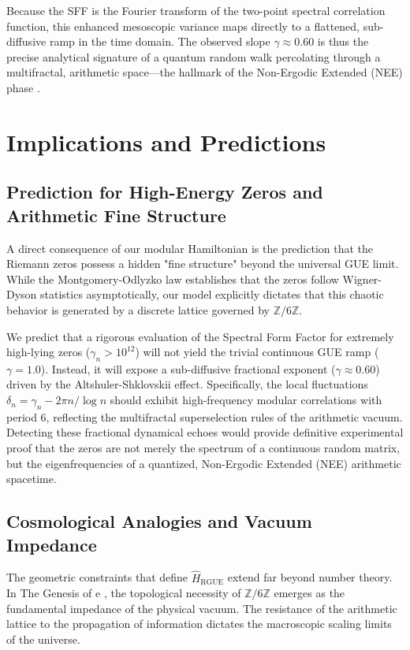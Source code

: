 \documentclass[aps,prl,preprint,superscriptaddress,floatfix]{revtex4-2}
\newcommand{\Zmod}{\mathbb{Z}/6\mathbb{Z}}
\begin{document}
Because the SFF is the Fourier transform of the two-point spectral correlation function, this enhanced mesoscopic variance maps directly to a flattened, sub-diffusive ramp in the time domain. The observed slope $\gamma \approx 0.60$ is thus the precise analytical signature of a quantum random walk percolating through a multifractal, arithmetic space—the hallmark of the Non-Ergodic Extended (NEE) phase \cite{Kravtsov2015, Khaymovich2020}.

\section{Implications and Predictions}

\subsection{Prediction for High-Energy Zeros and Arithmetic Fine Structure}

A direct consequence of our modular Hamiltonian is the prediction that the Riemann zeros possess a hidden "fine structure" beyond the universal GUE limit. While the Montgomery-Odlyzko law establishes that the zeros follow Wigner-Dyson statistics asymptotically, our model explicitly dictates that this chaotic behavior is generated by a discrete lattice governed by $\Zmod$.

We predict that a rigorous evaluation of the Spectral Form Factor for extremely high-lying zeros ($\gamma_n > 10^{12}$) will not yield the trivial continuous GUE ramp ($\gamma = 1.0$). Instead, it will expose a sub-diffusive fractional exponent ($\gamma \approx 0.60$) driven by the Altshuler-Shklovskii effect. Specifically, the local fluctuations $\delta_n = \gamma_n - 2\pi n/\log n$ should exhibit high-frequency modular correlations with period 6, reflecting the multifractal superselection rules of the arithmetic vacuum. Detecting these fractional dynamical echoes would provide definitive experimental proof that the zeros are not merely the spectrum of a continuous random matrix, but the eigenfrequencies of a quantized, Non-Ergodic Extended (NEE) arithmetic spacetime.

\subsection{Cosmological Analogies and Vacuum Impedance}

The geometric constraints that define $\hat{H}_{\text{RGUE}}$ extend far beyond number theory. In The Genesis of e \cite{PeinadorGenesis}, the topological necessity of $\Zmod$ emerges as the fundamental impedance of the physical vacuum. The resistance of the arithmetic lattice to the propagation of information dictates the macroscopic scaling limits of the universe.
\end{document}
